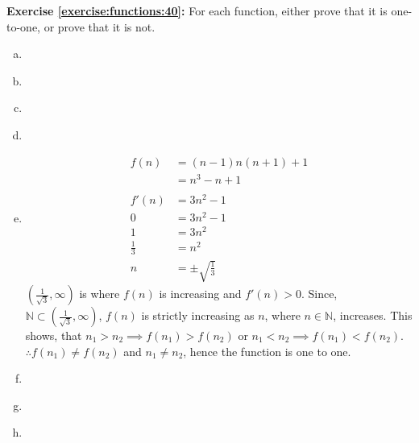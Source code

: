 \noindent\textbf{Exercise \ref{exercise:functions:40}:} %
For each function, either prove that it is one-to-one, or prove that it is not.
\begin{enumerate}[(a)]
\item \label{IsIt11?-linear}

\item \label{IsIt11?-square0}

\item \label{IsIt11?-square}

\item

\item
\begin{align*}
f(n) &= (n - 1)n(n+1) + 1\\
&= n^3 - n + 1\\
\\
f'(n) &= 3n^2 - 1\\
0 &= 3n^2 -1\\
1 &= 3n^2\\
\frac{1}{3} &= n^2\\
n &= \pm \sqrt{\frac{1}{3}}
\end{align*}
$(\frac{1}{\sqrt{3}}, \infty)$ is where $f(n)$ is increasing and $f'(n) > 0$.  Since, ${\mathbb N} \subset (\frac{1}{\sqrt{3}}, \infty)$, $f(n)$ is strictly increasing as $n$, where $n \in {\mathbb N}$, increases. This shows, that $n_1 > n_2 \implies f(n_1) > f(n_2)$ or $n_1 < n_2 \implies f(n_1) < f(n_2)$.  \\
$\therefore f(n_1) \neq f(n_2)$ and $n_1 \neq n_2$, hence the function is one to one.

\item

\item \label{IsIt11?-abs}

\item \label{modular_g}


\end{enumerate}
